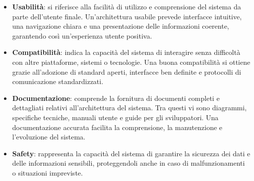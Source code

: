\begin{itemize}
    \item \textbf{Usabilità}: si riferisce alla facilità di utilizzo e comprensione del sistema da parte dell'utente finale. Un'architettura usabile prevede interfacce intuitive, una navigazione chiara e una presentazione delle informazioni coerente, garantendo così un'esperienza utente positiva.
    \item \textbf{Compatibilità}: indica la capacità del sistema di interagire senza difficoltà con altre piattaforme, sistemi o tecnologie. Una buona compatibilità si ottiene grazie all'adozione di standard aperti, interfacce ben definite e protocolli di comunicazione standardizzati.
    \item \textbf{Documentazione}: comprende la fornitura di documenti completi e dettagliati relativi all'architettura del sistema. Tra questi vi sono diagrammi, specifiche tecniche, manuali utente e guide per gli sviluppatori. Una documentazione accurata facilita la comprensione, la manutenzione e l'evoluzione del sistema.
    \item \textbf{Safety}: rappresenta la capacità del sistema di garantire la sicurezza dei dati e delle informazioni sensibili, proteggendoli anche in caso di malfunzionamenti o situazioni impreviste.
\end{itemize}


